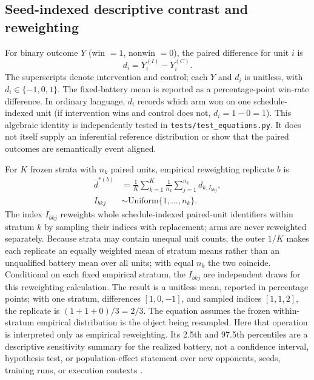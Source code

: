 \documentclass[aps,reprint,superscriptaddress,longbibliography,floatfix]{revtex4-2}
\begin{document}
\subsection{Seed-indexed descriptive contrast and reweighting}

For binary outcome $Y$ (win $=1$, nonwin $=0$), the paired difference for
unit $i$ is
\begin{equation}
 d_i=Y_i^{(I)}-Y_i^{(C)}.
 \label{eq:paired-difference}
\end{equation}
The superscripts denote intervention and control; each $Y$ and $d_i$ is
unitless, with $d_i\in\{-1,0,1\}$.  The fixed-battery mean is reported as a
percentage-point win-rate difference.  In ordinary language, $d_i$ records
which arm won on one schedule-indexed unit (if intervention wins and control
does not, $d_i=1-0=1$).  This algebraic identity is independently tested in
\texttt{tests/test\_equations.py}.  It does not itself supply an inferential
reference distribution or show that the paired outcomes are semantically event
aligned.

For $K$ frozen strata with $n_k$ paired units, empirical reweighting replicate
$b$ is
\begin{equation}
 \begin{aligned}
 \bar d^{*(b)}&=\frac{1}{K}\sum_{k=1}^{K}\frac{1}{n_k}
 \sum_{j=1}^{n_k}d_{k,I_{bkj}},\\
 I_{bkj}&\sim\mathrm{Uniform}\{1,\ldots,n_k\}.
 \end{aligned}
 \label{eq:paired-reweighting}
\end{equation}
The index $I_{bkj}$ reweights whole schedule-indexed paired-unit identifiers
within stratum $k$ by sampling their indices with replacement; arms are never
reweighted separately.  Because strata may contain unequal unit counts, the
outer $1/K$ makes each replicate an equally weighted mean of stratum means
rather than an unqualified battery mean over all units; with equal $n_k$ the
two coincide.  Conditional on each fixed empirical stratum, the $I_{bkj}$ are
independent draws for this reweighting calculation.  The result is a unitless
mean, reported in percentage points; with one stratum, differences
$[1,0,-1]$, and sampled indices $[1,1,2]$, the replicate is $(1+1+0)/3=2/3$.
The equation assumes the frozen within-stratum empirical distribution is the object being resampled.  Here that operation is interpreted only as
empirical reweighting.  Its 2.5th and 97.5th percentiles are a descriptive
sensitivity summary for the realized battery, not a confidence interval,
hypothesis test, or population-effect statement over new opponents, seeds,
training runs, or execution contexts \cite{field2007clustered}.
\end{document}
